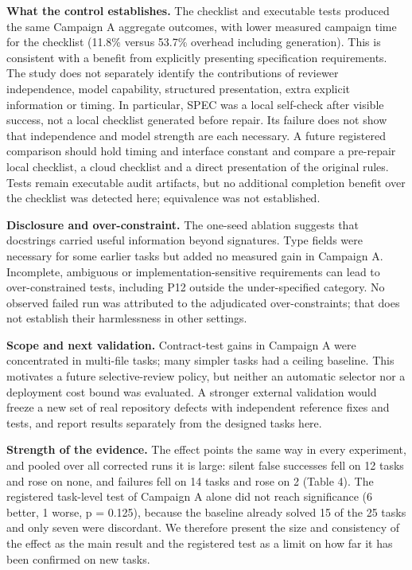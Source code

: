 \documentclass[11pt]{article}
\begin{document}
\textbf{What the control establishes.} The checklist and executable tests produced the same Campaign A aggregate outcomes, with lower measured campaign time for the checklist (11.8\% versus 53.7\% overhead including generation). This is consistent with a benefit from explicitly presenting specification requirements. The study does not separately identify the contributions of reviewer independence, model capability, structured presentation, extra explicit information or timing. In particular, SPEC was a local self-check after visible success, not a local checklist generated before repair. Its failure does not show that independence and model strength are each necessary. A future registered comparison should hold timing and interface constant and compare a pre-repair local checklist, a cloud checklist and a direct presentation of the original rules. Tests remain executable audit artifacts, but no additional completion benefit over the checklist was detected here; equivalence was not established.

\textbf{Disclosure and over-constraint.} The one-seed ablation suggests that docstrings carried useful information beyond signatures. Type fields were necessary for some earlier tasks but added no measured gain in Campaign A. Incomplete, ambiguous or implementation-sensitive requirements can lead to over-constrained tests, including P12 outside the under-specified category. No observed failed run was attributed to the adjudicated over-constraints; that does not establish their harmlessness in other settings.

\textbf{Scope and next validation.} Contract-test gains in Campaign A were concentrated in multi-file tasks; many simpler tasks had a ceiling baseline. This motivates a future selective-review policy, but neither an automatic selector nor a deployment cost bound was evaluated. A stronger external validation would freeze a new set of real repository defects with independent reference fixes and tests, and report results separately from the designed tasks here.

\textbf{Strength of the evidence.} The effect points the same way in every experiment, and pooled over all corrected runs it is large: silent false successes fell on 12 tasks and rose on none, and failures fell on 14 tasks and rose on 2 (Table 4). The registered task-level test of Campaign A alone did not reach significance (6 better, 1 worse, p = 0.125), because the baseline already solved 15 of the 25 tasks and only seven were discordant. We therefore present the size and consistency of the effect as the main result and the registered test as a limit on how far it has been confirmed on new tasks.
\end{document}
